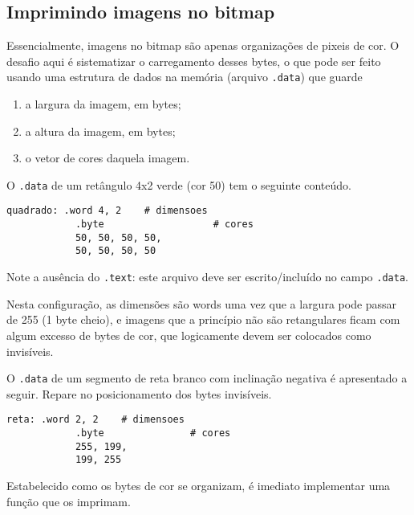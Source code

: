 \documentclass[10pt, a4paper, twoside]{article}
\begin{document}
    \subsection{Imprimindo imagens no bitmap}
      Essencialmente, imagens no bitmap são apenas organizações de pixeis de cor.
      O desafio aqui é sistematizar o carregamento desses bytes, o que pode ser feito usando uma estrutura de dados na memória (arquivo {\tt .data}) que guarde
      \begin{enumerate}
        \item 
        a largura da imagem, em bytes;
        
        \item
        a altura da imagem, em bytes;
        
        \item 
        o vetor de cores daquela imagem.
      \end{enumerate}
      \begin{exemplo}
        O {\tt .data} de um retângulo 4x2 verde (cor 50) tem o seguinte conteúdo.
        \begin{lstlisting}[caption=Exemplo de {\tt .data} sem cor invisível]
            quadrado: .word 4, 2    # dimensoes
            .byte                   # cores
            50, 50, 50, 50,   
            50, 50, 50, 50
        \end{lstlisting}
        Note a ausência do {\tt .text}: 
        este arquivo deve ser escrito/incluído no campo {\tt .data}. 
      \end{exemplo}
      Nesta configuração, as dimensões são words uma vez que a largura pode passar de 255 (1 byte cheio), e imagens que a princípio não são retangulares ficam com algum excesso de bytes de cor, que logicamente devem ser colocados como invisíveis.
      \begin{exemplo}
        O {\tt .data} de um segmento de reta branco com inclinação negativa é apresentado a seguir.
        Repare no posicionamento dos bytes invisíveis.
        \begin{lstlisting}[caption=Exemplo de {\tt .data} com cor invisível]
            reta: .word 2, 2    # dimensoes
            .byte               # cores
            255, 199,    
            199, 255
        \end{lstlisting}
      \end{exemplo}
      Estabelecido como os bytes de cor se organizam, é imediato implementar uma função que os imprimam.
\end{document}

